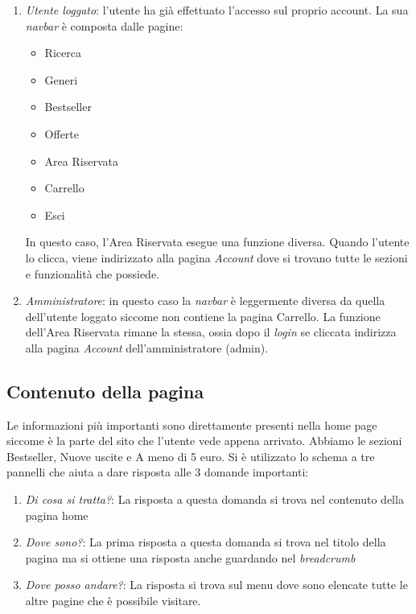 \begin{enumerate}
		\item \textit{Utente loggato}: l’utente ha già effettuato l’accesso sul proprio account. La sua \textit{navbar} è composta dalle pagine:
			\begin{itemize}
				\item Ricerca
				\item Generi
				\item Bestseller
				\item Offerte
				\item Area Riservata
				\item Carrello
				\item Esci
			\end{itemize}
		In questo caso, l’Area Riservata esegue una funzione diversa. Quando l’utente lo clicca, viene indirizzato alla pagina \textit{Account} dove si trovano tutte le sezioni e funzionalità che possiede.
		\item \textit{Amministratore}: in questo caso la \textit{navbar} è leggermente diversa da quella dell'utente loggato siccome non contiene la pagina Carrello. La funzione dell'Area Riservata rimane la stessa, ossia dopo il \textit{login} se cliccata indirizza alla pagina \textit{Account} dell'amministratore (admin).
	\end{enumerate}
	
\subsection{Contenuto della pagina}
Le informazioni più importanti sono direttamente presenti nella home page siccome è la parte del sito che l’utente vede appena arrivato. Abbiamo le sezioni Bestseller, Nuove uscite e A meno di 5 euro.
Si è utilizzato lo schema a tre pannelli che aiuta a dare risposta alle 3 domande importanti:
\begin{enumerate}
	\item \textit{Di cosa si tratta?}: La risposta a questa domanda si trova nel contenuto della pagina home
	\item \textit{Dove sono?}: La prima risposta a questa domanda si trova nel titolo della pagina ma si ottiene
		una risposta anche guardando nel \textit{breadcrumb}
	\item \textit{Dove posso andare?}: La risposta si trova sul menu dove sono elencate tutte le altre pagine che
		è possibile visitare.
\end{enumerate}	
	
	
	
	
	
	
	
	
	
	
	
	
	
	
	